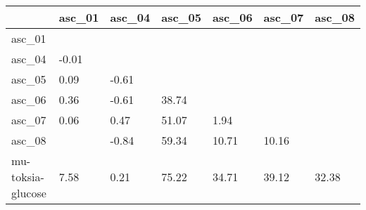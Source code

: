 \begin{tabular}{lllllll}
\toprule
{} & asc\_01 & asc\_04 & asc\_05 & asc\_06 & asc\_07 & asc\_08 \\
\midrule
asc\_01            &        &        &        &        &        &        \\
asc\_04            &  -0.01 &        &        &        &        &        \\
asc\_05            &   0.09 &  -0.61 &        &        &        &        \\
asc\_06            &   0.36 &  -0.61 &  38.74 &        &        &        \\
asc\_07            &   0.06 &   0.47 &  51.07 &   1.94 &        &        \\
asc\_08            &        &  -0.84 &  59.34 &  10.71 &  10.16 &        \\
mu-toksia-glucose &   7.58 &   0.21 &  75.22 &  34.71 &  39.12 &  32.38 \\
\bottomrule
\end{tabular}
